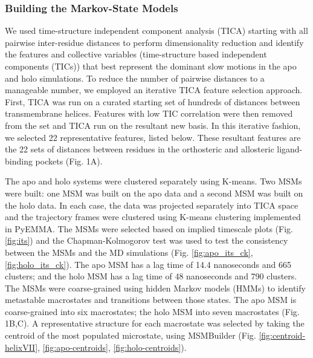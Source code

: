 \subsubsection{Building the Markov-State Models}
We used time-structure independent component analysis (TICA)\cite{Schwantes2013, Perez-Hernandez2013,Nuske2014} starting with all pairwise inter-residue distances to perform dimensionality reduction and identify the features and collective variables (time-structure based independent components (TICs)) that best represent the dominant slow motions in the apo and holo simulations.
To reduce the number of pairwise distances to a manageable number, we employed an iterative TICA feature selection approach.
First, TICA was run on a curated starting set of hundreds of distances between transmembrane helices.
Features with low TIC correlation were then removed from the set and TICA run on the resultant new basis.
In this iterative fashion, we selected 22 representative features, listed below.
These resultant features are the 22 sets of distances between residues in the orthosteric and allosteric ligand-binding pockets (Fig. 1A).

The apo and holo systems were clustered separately using K-means.
Two MSMs were built: one MSM was built on the apo data and a second MSM was built on the holo data.
In each case, the data was projected separately into TICA space and the trajectory frames were clustered using K-means clustering implemented in PyEMMA\cite{Scherer2015}.
The MSMs were selected based on implied timescale plots (Fig. \ref{fig:its}) and the Chapman-Kolmogorov test\cite{Prinz2011a} was used to test the consistency between the MSMs and the MD simulations (Fig. \ref{fig:apo_its_ck}, \ref{fig:holo_its_ck}).
The apo MSM has a lag time of 14.4 nanoseconds and 665 clusters; and the holo MSM has a lag time of 48 nanoseconds and 790 clusters.
The MSMs were coarse-grained using hidden Markov models (HMMs)\cite{Noe2013a} to identify metastable macrostates and transitions between those states.
The apo MSM is coarse-grained into six macrostates; the holo MSM into seven macrostates (Fig. 1B,C).
A representative structure for each macrostate was selected by taking the centroid of the most populated microstate, using MSMBuilder\cite{Beauchamp2011} (Fig. \ref{fig:centroid-helixVII}, \ref{fig:apo-centroids}, \ref{fig:holo-centroids}).


